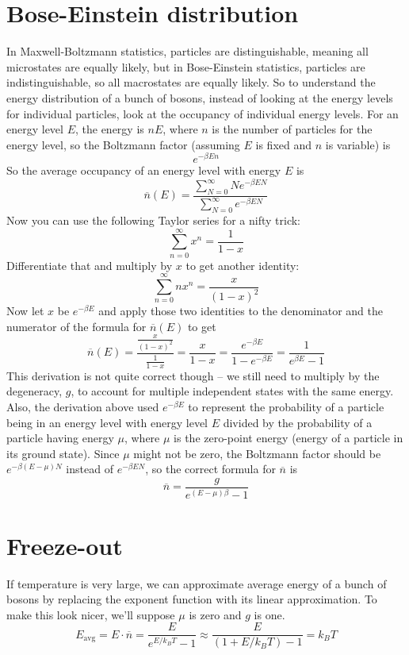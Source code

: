 \documentclass[12pt]{article}
\begin{document}
\section{Bose-Einstein distribution}
In Maxwell-Boltzmann statistics, particles are distinguishable, meaning all microstates are equally likely, but in Bose-Einstein statistics, particles are indistinguishable, so all macrostates are equally likely. So to understand the energy distribution of a bunch of bosons, instead of looking at the energy levels for individual particles, look at the occupancy of individual energy levels. For an energy level $E$, the energy is $nE$, where $n$ is the number of particles for the energy level, so the Boltzmann factor (assuming $E$ is fixed and $n$ is variable) is
\[e^{- \beta E n}\]
So the average occupancy of an energy level with energy $E$ is
\[\overline{n}(E) = \frac{\sum\limits_{N=0}^\infty N e^{- \beta E N}}{\sum\limits_{N=0}^\infty e^{- \beta E N}}\]
Now you can use the following Taylor series for a nifty trick:
\[\sum_{n=0}^\infty x^n = \frac{1}{1 - x} \]
Differentiate that and multiply by $x$ to get another identity:
\[\sum_{n=0}^\infty nx^n = \frac{x}{(1-x)^2} \]
Now let $x$ be $e^{-\beta E}$ and apply those two identities to the denominator and the numerator of the formula for $\overline{n}(E)$ to get
\[\overline{n}(E) = \frac{ \frac{x}{(1-x)^2} }{ \frac{1}{1-x} } = \frac{x}{1 - x} = \frac{e^{-\beta E}}{1 - e^{-\beta E}} = \frac{1}{e^{\beta E} - 1} \]
This derivation is not quite correct though -- we still need to multiply by the degeneracy, $g$, to account for multiple independent states with the same energy. Also, the derivation above used $e^{-\beta E}$ to represent the probability of a particle being in an energy level with energy level $E$ divided by the probability of a particle having energy $\mu$, where $\mu$ is the zero-point energy (energy of a particle in its ground state). Since $\mu$ might not be zero, the Boltzmann factor should be $e^{-\beta (E - \mu) N}$ instead of $e^{-\beta E N}$, so the correct formula for $\overline{n}$ is
\[\overline{n} = \frac{g}{e^{(E - \mu) \beta} - 1} \]

\section{Freeze-out}
If temperature is very large, we can approximate average energy of a bunch of bosons by replacing the exponent function with its linear approximation. To make this look nicer, we'll suppose $\mu$ is zero and $g$ is one.
\[E_\text{avg} = E \cdot \overline{n} = \frac{E}{e^{E / k_B T} - 1} \approx \frac{E}{(1 + E / k_B T) - 1} = k_B T\]
\end{document}
